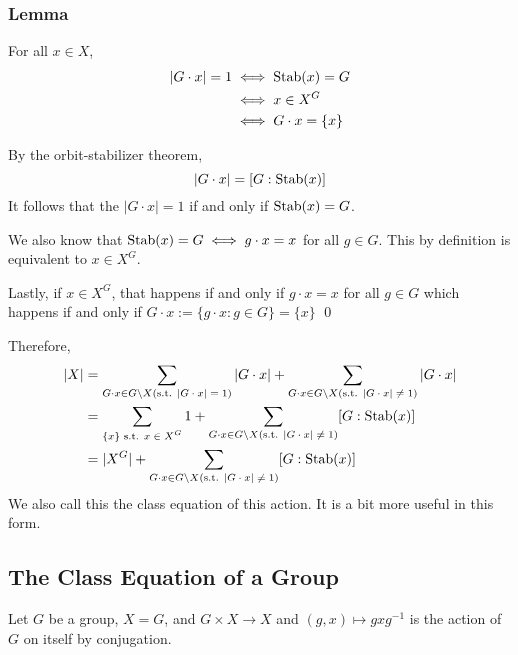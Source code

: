 \documentclass{article}
\renewenvironment{proof}{{\bfseries\color{blue1} Proof:}}{\qed}
\begin{document}
\subsubsection{Lemma}
\begin{idea}
    For all $x\in X$,
    \begin{align*}
        |G\cdot x| = 1 & \iff \operatorname{Stab}(x) = G     \\
                       & \iff x \in X^G        \\
                       & \iff G\cdot x = \{x\}
    \end{align*}
\end{idea}
\begin{proof}
    By the orbit-stabilizer theorem,
    \begin{equation*}
        |G\cdot x| = [G:\operatorname{Stab}(x)]
    \end{equation*}
    It follows that the $|G\cdot x|=1$ if and only if $\operatorname{Stab}(x) = G$.

    We also know that $\operatorname{Stab}(x)=G\iff g\cdot x=x$ for all $g\in G$. This by definition is equivalent to $x\in X^G$.

    Lastly, if $x\in X^G$, that happens if and only if $g\cdot x=x$ for all $g\in G$ which happens if and only if $G\cdot x:=\{g\cdot x: g\in G\}=\{x\}$
\end{proof}

Therefore,
\begin{align*}
    |X| & = \sum_{G\cdot x\in G \text{\textbackslash} X \text{(s.t. $|G\cdot x|=1$)}} |G\cdot x| +\sum_{G\cdot x\in G \text{\textbackslash} X \text{(s.t. $|G\cdot x|\neq1$)}} |G\cdot x| \\
        & = \sum_{\{x\}\text{ s.t. $x\in X^G$}} 1 + \sum_{G\cdot x\in G \text{\textbackslash} X \text{(s.t. $|G\cdot x|\neq1$)}} [G:\operatorname{Stab}(x)]                           \\
        & = |X^G| + \sum_{G\cdot x\in G \text{\textbackslash} X \text{(s.t. $|G\cdot x|\neq1$)}} [G:\operatorname{Stab}(x)]
\end{align*}
We also call this the class equation of this action. It is a bit more useful in this form.
\subsection{The Class Equation of a Group}
Let $G$ be a group, $X=G$, and $G\times X\rightarrow X$ and $(g,x) \mapsto gxg^{-1}$ is the action of $G$ on itself by conjugation.
\end{document}
